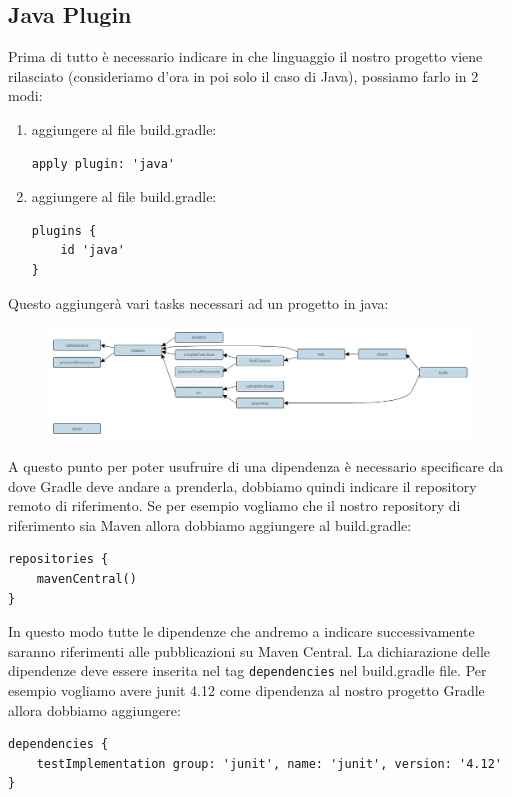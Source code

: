 \subsection{Java Plugin}
Prima di tutto è necessario indicare in che linguaggio il nostro progetto viene rilasciato (consideriamo d'ora in poi solo il caso di Java), possiamo farlo in 2 modi:
\begin{enumerate}
    \item aggiungere al file build.gradle:
    \begin{lstlisting}[frame=single]
apply plugin: 'java' \end{lstlisting}
    \item aggiungere al file build.gradle:
    \begin{lstlisting}[frame=single]
plugins {
    id 'java'
}
    \end{lstlisting}
\end{enumerate}
Questo aggiungerà vari tasks necessari ad un progetto in java:
\begin{figure}[H]
    \centering
    \includegraphics[width=1.0\linewidth]{3DependencyManagement/javaPlug/javaPluginTasks.png}
    \label{fig:my_label}
\end{figure}
A questo punto per poter usufruire di una dipendenza è necessario specificare da dove Gradle deve andare a prenderla, dobbiamo quindi indicare il repository remoto di riferimento. Se per esempio vogliamo che il nostro repository di riferimento sia Maven allora dobbiamo aggiungere al build.gradle:
\begin{lstlisting}[frame=single]
repositories {
    mavenCentral()
} \end{lstlisting}
In questo modo tutte le dipendenze che andremo a indicare successivamente saranno riferimenti alle pubblicazioni su Maven Central. La dichiarazione delle dipendenze deve essere inserita nel tag \texttt{dependencies} nel build.gradle file. Per esempio vogliamo avere junit 4.12 come dipendenza al nostro progetto Gradle allora dobbiamo aggiungere:
\begin{lstlisting}[frame=single]
dependencies {
    testImplementation group: 'junit', name: 'junit', version: '4.12' 
} \end{lstlisting}
